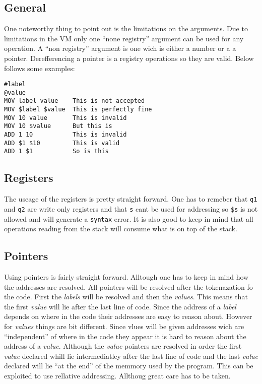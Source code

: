 \documentclass{article}
\newcommand{\V}{\verb}
\begin{document}
\subsection{General}
One noteworthy thing to point out is the limitations on the arguments. Due to
limitations in the VM only one ``none registry'' argument can be used for any
operation. A ``non registry'' argument is one wich is either a number or a
a pointer. Derefferencing a pointer is a registry operations so they are valid.
Below follows some examples:
\begin{verbatim}
#label
@value
MOV label value    This is not accepted
MOV $label $value  This is perfectly fine
MOV 10 value       This is invalid
MOV 10 $value      But this is
ADD 1 10           This is invalid
ADD $1 $10         This is valid
ADD 1 $1           So is this
\end{verbatim}

\subsection{Registers}
The useage of the registers is pretty straight forward. One has to remeber that
\V+q1+ and \V+q2+ are write only registers and that \V+s+ cant be used for
addressing so \verb+$s+ is not allowed and will generate a \verb+syntax+ error.
It is also good to keep in mind that all operations reading from the stack will
consume what is on top of the stack.

\subsection{Pointers}
Using pointers is fairly straight forward. Alltough one has to keep in mind how
the addresses are resolved. All pointers will be resolved after the
tokenazation fo the code. First the \emph{labels} will be resolved and then the
\emph{values}.
This means that the first \emph{value} will lie after the last line of code. Since the
address of a \emph{label} depends on where in the code their addresses are easy to
reason about. However for \emph{values} things are bit different. Since vlues
will be given addresses wich are ``independent'' of where in the code they appear it is
hard to reason about the address of a \emph{value}. Although the \emph{value} pointers are
resolved in order the first \emph{value} declared whill lie intermediatley after the
last line of code and the last \emph{value} declared will lie ``at the end'' of the
memmory used by the program. This can be exploited to use rellative addressing.
Allthoug great care has to be taken.
\end{document}
